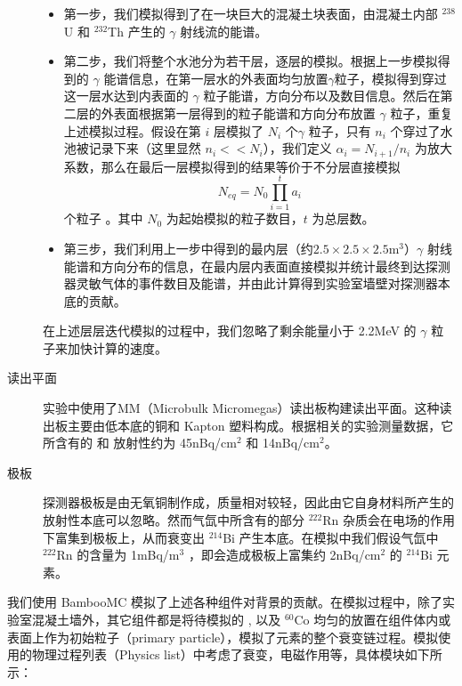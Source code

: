 \begin{description}
    \begin{itemize}
        \item 第一步，我们模拟得到了在一块巨大的混凝土块表面，由混凝土内部 $^{238}$U 和 $^{232}$Th 产生的 $\gamma$ 射线流的能谱。
        \item 第二步，我们将整个水池分为若干层，逐层的模拟。根据上一步模拟得到的 $\gamma$ 能谱信息，在第一层水的外表面均匀放置$\gamma$粒子，模拟得到穿过这一层水达到内表面的 $\gamma$ 粒子能谱，方向分布以及数目信息。然后在第二层的外表面根据第一层得到的粒子能谱和方向分布放置 $\gamma$ 粒子，重复上述模拟过程。假设在第 $i$ 层模拟了 $N_i$ 个$\gamma$ 粒子，只有 $n_i$ 个穿过了水池被记录下来（这里显然 $n_i<<N_i$），我们定义 $\alpha_i=N_{i+1}/n_i$ 为放大系数，那么在最后一层模拟得到的结果等价于不分层直接模拟 $$N_{eq}=N_0\prod_{i=1}^{t}a_i$$ 个粒子 。其中 $N_0$ 为起始模拟的粒子数目，$t$ 为总层数。
        \item 第三步，我们利用上一步中得到的最内层（约$2.5\times2.5\times2.5$m$^3$）$\gamma$ 射线能谱和方向分布的信息，在最内层内表面直接模拟并统计最终到达探测器灵敏气体的事件数目及能谱，并由此计算得到实验室墙壁对探测器本底的贡献。
    \end{itemize}
    在上述层层迭代模拟的过程中，我们忽略了剩余能量小于 2.2MeV 的 $\gamma$ 粒子来加快计算的速度。

    \item[读出平面] 实验中使用了MM（Microbulk Micromegas）读出板构建读出平面。这种读出板主要由低本底的铜和 Kapton 塑料构成。根据相关的实验测量数据，它所含有的 \utte 和 \thttt 放射性约为 45nBq/cm$^2$ 和 14nBq/cm$^2$。

    \item[极板] 探测器极板是由无氧铜制作成，质量相对较轻，因此由它自身材料所产生的放射性本底可以忽略。然而气氙中所含有的部分 $^{222}$Rn 杂质会在电场的作用下富集到极板上，从而衰变出 $^{214}$Bi 产生本底。在模拟中我们假设气氙中 $^{222}$Rn 的含量为 1mBq/m$^3$ ，即会造成极板上富集约 2nBq/cm$^2$ 的 $^{214}$Bi 元素。
\end{description}

\vspace{0.4cm}

我们使用 BambooMC 模拟了上述各种组件对背景的贡献。在模拟过程中，除了实验室混凝土墙外，其它组件都是将待模拟的 \utte, \thttt 以及 $^{60}$Co 均匀的放置在组件体内或表面上作为初始粒子（primary particle），模拟了元素的整个衰变链过程。模拟使用的物理过程列表（Physics list）中考虑了衰变，电磁作用等，具体模块如下所示：

